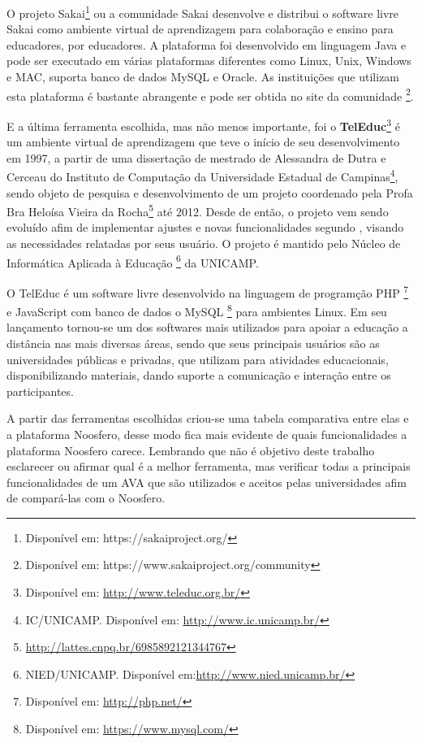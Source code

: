 O projeto Sakai\footnote{Disponível em: https://sakaiproject.org/ } ou a comunidade Sakai desenvolve e distribui o software livre Sakai como ambiente virtual de aprendizagem para colaboração e ensino para educadores, por educadores. A plataforma foi desenvolvido em linguagem Java e pode ser executado em várias plataformas diferentes como Linux, Unix, Windows e MAC, suporta banco de dados MySQL e Oracle. As instituições que utilizam esta plataforma é bastante abrangente e pode ser obtida no site da comunidade \footnote{Disponível em: https://www.sakaiproject.org/community}.

E a última ferramenta escolhida, mas não menos importante, foi o \textbf{TelEduc}\footnote{Disponível em: \url{http://www.teleduc.org.br/}} é um ambiente virtual de aprendizagem que teve o início de seu desenvolvimento em 1997, a partir de uma dissertação de mestrado de Alessandra de Dutra e Cerceau do Instituto de Computação da Universidade Estadual de Campinas\footnote{IC/UNICAMP. Disponível em: \url{http://www.ic.unicamp.br/}}, sendo objeto de pesquisa e desenvolvimento de um projeto coordenado pela Profa Bra Heloísa Vieira da Rocha\footnote{\url{http://lattes.cnpq.br/6985892121344767}} até 2012. Desde de então, o projeto vem sendo evoluído afim de implementar ajustes e novas funcionalidades segundo \cite{rocha2002ambiente}, visando as necessidades relatadas por seus usuário. O projeto é mantido pelo Núcleo de Informática Aplicada à Educação \footnote{NIED/UNICAMP. Disponível em:\url{http://www.nied.unicamp.br/}} da UNICAMP.

O TelEduc é um software livre desenvolvido na linguagem de programção PHP \footnote{Disponível em: \url{http://php.net/}} e JavaScript com banco de dados o MySQL \footnote{Disponível em: \url{https://www.mysql.com/}} para ambientes Linux. Em seu lançamento tornou-se um dos softwares mais utilizados para apoiar a educação a distância nas mais diversas áreas, sendo que seus principais usuários são as universidades públicas e privadas, que utilizam para atividades educacionais, disponibilizando materiais, dando suporte a comunicação e interação entre os participantes.

A partir das ferramentas escolhidas criou-se uma tabela comparativa entre elas e a plataforma Noosfero, desse modo fica mais evidente de quais funcionalidades a plataforma Noosfero carece. Lembrando que não é objetivo deste trabalho esclarecer ou afirmar qual é a melhor ferramenta, mas verificar todas a principais funcionalidades de um AVA que são utilizados e aceitos pelas universidades afim de compará-las com o Noosfero.

